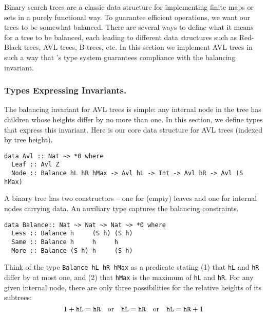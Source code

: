 
\newcommand{\avl}[1]{\texttt{[image: avl.\#1.eps]}}      %
\newcommand{\lift}[1]{\raise 0.48cm \hbox{#1}}


Binary search trees are a classic data structure for implementing 
finite maps or sets in a purely functional way.  To guarantee efficient
operations, we want our trees to be somewhat balanced.  There are several
ways to define what it means for a tree to be balanced, each leading to 
different data structures such as Red-Black trees, AVL trees, B-trees, etc.
In this section we implement AVL trees in such a way that \om's type system
guarantees compliance with the balancing invariant.

\subsubsection{Types Expressing Invariants.}

The balancing invariant for AVL trees is simple: any internal node in the tree
has children whose heights differ by no more than one.  In this section, 
we define types that express this invariant.
Here is our core data structure for AVL trees (indexed by tree height).
{\small
\begin{verbatim}
data Avl :: Nat ~> *0 where
  Leaf :: Avl Z
  Node :: Balance hL hR hMax -> Avl hL -> Int -> Avl hR -> Avl (S hMax)
\end{verbatim}
}
\noindent
A binary tree has two constructors -- one for (empty) leaves 
and one for internal nodes carrying data.
An auxiliary type captures the balancing constraints.
{\small
\begin{verbatim}
data Balance:: Nat ~> Nat ~> Nat ~> *0 where
  Less :: Balance h     (S h) (S h)
  Same :: Balance h     h     h
  More :: Balance (S h) h     (S h)
\end{verbatim}
}
\noindent
Think of the type \verb|Balance hL hR hMax| as a predicate stating
(1) that \verb|hL| and \verb|hR| differ by at most one, and
(2) that \verb|hMax| is the maximum of \verb|hL| and \verb|hR|.
For any given internal node, there are only three possibilities for 
the relative heights of its subtrees:
\[
1 + \verb|hL| = \verb|hR| \quad \textrm{or} \quad
    \verb|hL| = \verb|hR| \quad \textrm{or} \quad
    \verb|hL| = \verb|hR| + 1 
\]

